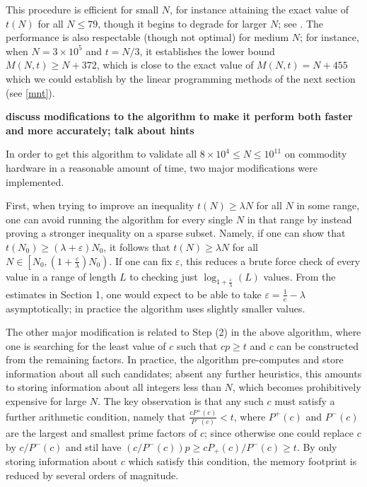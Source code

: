 \documentclass[12pt,a4paper,reqno]{amsart}
\numberwithin{equation}{section}
\theoremstyle{plain}
\theoremstyle{definition}
\newcommand\eps{\varepsilon}
\begin{document}
This procedure is efficient for small $N$, for instance attaining the exact value of $t(N)$ for all $N \leq 79$, though it begins to degrade for larger $N$; see .  The performance is also respectable (though not optimal) for medium $N$; for instance, when $N=3 \times 10^5$ and $t=N/3$, it establishes the lower bound $M(N,t) \geq N+372$, which is close to the exact value of $M(N,t) = N+455$ which we could establish by the linear programming methods of the next section (see \eqref{mnt}).

{\bf discuss modifications to the algorithm to make it perform both faster and more accurately; talk about hints}

In order to get this algorithm to validate all $8 \times 10^4 \leq N \leq 10^{11}$ on commodity hardware in a reasonable amount of time, two major modifications were implemented. 

First, when trying to improve an inequality $t(N) \geq \lambda N$ for all $N$ in some range, one can avoid running the algorithm for every single $N$ in that range by instead proving a stronger inequality on a sparse subset. Namely, if one can show that $t(N_0) \geq (\lambda + \eps)N_0$, it follows that $t(N) \geq \lambda N$ for all $N \in \left[N_0, (1+\frac{\eps}{\lambda})N_0\right)$. If one can fix $\eps$, this reduces a brute force check of every value in a range of length $L$ to checking just $\log_{1+\frac{\eps}{\lambda}}(L)$ values. From the estimates in Section 1, one would expect to be able to take $\eps = \frac{1}{e}-\lambda$ asymptotically; in practice the algorithm uses slightly smaller values. 

The other major modification is related to Step (2) in the above algorithm, where one is searching for the least value of $c$ such that $cp\geq t$ and $c$ can be constructed from the remaining factors. In practice, the algorithm pre-computes and store information about all such candidates; absent any further heuristics, this amounts to storing information about all integers less than $N$, which becomes prohibitively expensive for large $N$. The key observation is that any such $c$ must satisfy a further arithmetic condition, namely that $\frac{cP^+(c)}{P^-(c)} < t$, where $P^+(c)$ and $P^-(c)$ are the largest and smallest prime factors of $c$; since otherwise one could replace $c$ by $c/P^-(c)$ and stil have $(c/P^-(c)) p \geq cP_+(c)/P^-(c) \geq t$. By only storing information about $c$ which satisfy this condition, the memory footprint is reduced by several orders of magnitude.
\end{document}
